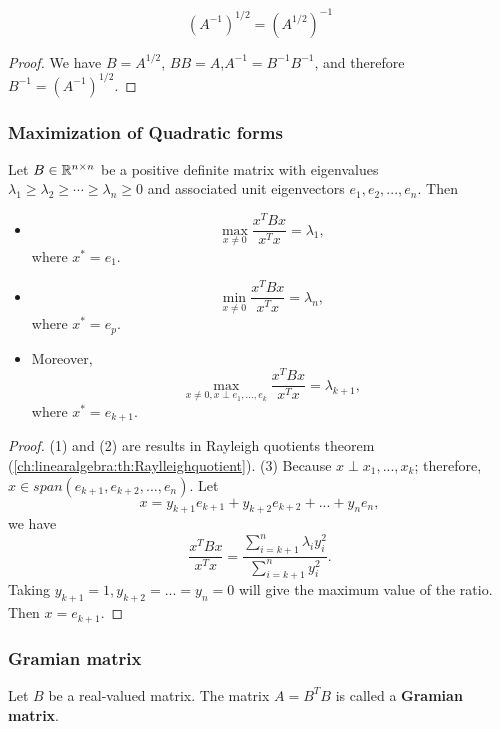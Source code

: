 \begin{refsection}
\begin{corollary}
	$$(A^{-1})^{1/2} = (A^{1/2})^{-1}$$
\end{corollary}
\begin{proof}
	We have
	$B = A^{1/2}$, $BB=A$,$A^{-1} = B^{-1}B^{-1}$, and therefore $B^{-1} = (A^{-1})^{1/2}$.
\end{proof}




\subsubsection{Maximization of Quadratic forms}

\begin{theorem}\label{ch:linearalgebra:th:MaximizingQuadraticFormsOnUnitSpheres}
Let $B\in \mathbb{R}^{n\times n}$ be a positive definite matrix with eigenvalues $\lambda_1\geq\lambda_2\geq \cdots\geq \lambda_n \geq 0$ and associated unit eigenvectors $e_1,e_2,...,e_n$. Then
\begin{itemize}
	\item $$\max_{x\neq 0} \frac{x^TBx}{x^Tx} = \lambda_1,$$
	where $x^*=e_1$.
	\item $$\min_{x\neq 0} \frac{x^TBx}{x^Tx} = \lambda_n,$$
	where $x^*=e_p$.
	\item Moreover, $$\max_{x\neq 0, x\perp e_1,...,e_k} \frac{x^TBx}{x^Tx} = \lambda_{k+1},$$
	where $x^*=e_{k+1}$.
\end{itemize}
\end{theorem}
\begin{proof}
(1) and (2) are results in Rayleigh quotients theorem (\autoref{ch:linearalgebra:th:Raylleighquotient}). (3)	Because $x\perp x_1,...,x_k$; therefore, $x\in span(e_{k+1}, e_{k+2},..., e_n)$. Let
$$x = y_{k+1}e_{k+1} + y_{k+2} e_{k+2} + ... + y_n e_n,$$
we have
$$\frac{x^TBx}{x^Tx} = \frac{\sum_{i=k+1}^n \lambda_i y_i^2}{\sum_{i=k+1}^n y_i^2}.$$
Taking $y_{k+1} = 1, y_{k+2} = ... = y_n = 0$ will give the maximum value of the ratio. 
Then $x = e_{k+1}$.
\end{proof}



\subsubsection{Gramian matrix}

\begin{definition}
Let $B$ be a real-valued matrix. The matrix $A = B^TB$ is called a \textbf{Gramian matrix}.	
\end{definition}


\end{refsection}
